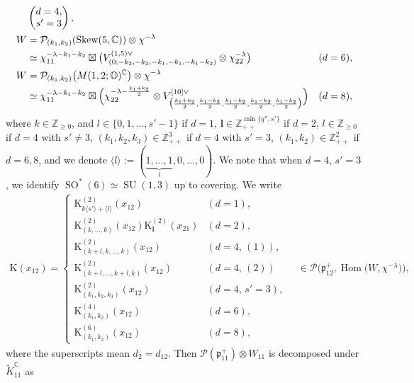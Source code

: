 \documentclass[pdftex]{sigma}
\numberwithin{equation}{section}
\newcommand{\bl}{\mathbf{l}}
\newcommand{\BZ}{\mathbb{Z}}
\newcommand{\BC}{\mathbb{C}}
\newcommand{\BO}{\mathbb{O}}
\newcommand{\fp}{\mathfrak{p}}
\newcommand{\cP}{\mathcal{P}}
\newcommand{\rK}{\mathrm{K}}
\newcommand{\Hom}{\operatorname{Hom}}
\newcommand{\Skew}{\operatorname{Skew}}
\begin{document}
\begin{align*}
& \begin{pmatrix}d=4,\\ s'=3\end{pmatrix}, \\
W&=\cP_{(k_1,k_2)}(\Skew(5,\BC))\otimes\chi^{-\lambda}\\
&\simeq\chi_{11}^{-\lambda-k_1-k_2}\boxtimes\big(V_{(0;-k_2,-k_2,-k_1,-k_1,-k_1-k_2)}^{(1,5)\vee}\otimes\chi_{22}^{-\lambda}\big)
& (d=6), \\
W&=\cP_{(k_1,k_2)}\big(M(1,2;\BO)^\BC\big)\otimes\chi^{-\lambda} \\
&\simeq\chi_{11}^{-\lambda-k_1-k_2}\boxtimes \Bigl(\chi_{22}^{-\lambda-\frac{k_1+k_2}{2}}
\otimes V_{\big(\frac{k_1+k_2}{2},\frac{k_1-k_2}{2},\frac{k_1-k_2}{2},\frac{k_1-k_2}{2},\frac{k_1-k_2}{2}\big)}^{[10]\vee}\Bigr) & (d=8),
\end{align*}
where $k\in\BZ_{\ge 0}$, and $l\in\{0,1,\ldots,s'-1\}$ if $d=1$, $\bl\in\BZ_{++}^{\min\{ q'',s'\}}$ if $d=2$,
$l\in\BZ_{\ge 0}$ if $d=4$ with $s'\ne 3$, $(k_1,k_2,k_3)\in\BZ_{++}^3$ if $d=4$ with $s'=3$,
$(k_1,k_2)\in\BZ_{++}^2$ if $d=6,8$, and we denote $\langle l\rangle:=(\underbrace{1,\ldots,1}_l,0,\ldots,0)$.
We note that when $d=4$, $s'=3$, we identify $\operatorname{SO}^*(6)\simeq \operatorname{SU}(1,3)$ up to covering. We write
\begin{gather*} \rK(x_{12})=\begin{cases}
\rK_{k\langle s'\rangle+\langle l\rangle}^{(2)}(x_{12}) & (d=1),\\
\rK_{(k,\ldots,k)}^{(2)}(x_{12})\rK_\bl^{(2)}(x_{21}) & (d=2),\\
\rK_{(k+l,k,\ldots,k)}^{(2)}(x_{12}) & (d=4,\,(1)),\\
\rK_{(k+l,\ldots,k+l,k)}^{(2)}(x_{12}) & (d=4,\,(2))\\
\rK_{(k_1,k_2,k_3)}^{(2)}(x_{12}) & (d=4,\,s'=3),\\
\rK_{(k_1,k_2)}^{(4)}(x_{12}) & (d=6),\\
\rK_{(k_1,k_2)}^{(6)}(x_{12}) & (d=8),
\end{cases}\quad\in \cP\big(\fp^+_{12},\Hom\big(W,\chi^{-\lambda}\big)\big), \end{gather*}
where the superscripts mean $d_2=d_{12}$. Then $\cP(\fp^+_{11})\otimes W_{11}$ is decomposed under $\tilde{K}_{11}^\BC$ as
\end{document}
